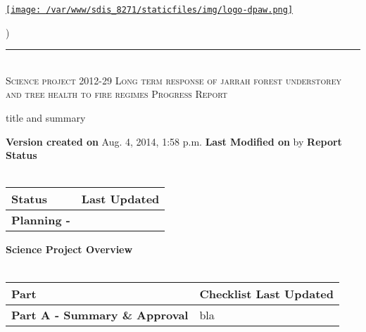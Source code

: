 \documentclass[version=last, paper=a4, DIV=18, usenames, dvipsnames]{scrartcl}
\newcommand{\HRule}{\rule{\linewidth}{0.1pt}}
\begin{document}
\setcounter{secnumdepth}{-1}


\begin{titlepage}
\begin{center}
\begin{minipage}[t]{0.28\textwidth}
\begin{flushleft}
\href{http://www.dpaw.wa.gov.au}{\texttt{[image: /var/www/sdis\_8271/staticfiles/img/logo-dpaw.png]}}
\end{flushleft}
\end{minipage}
\begin{minipage}[b]{0.7\textwidth}
\begin{flushright}
    \href{http://sdis.dpaw.wa.gov.au/documents/progressreport/1021/download/tex/}{}) \\
\end{flushright}
\end{minipage}
\HRule \\[0.4cm]
\vfill
\textsc{\Huge Science project 2012-29 Long term response of jarrah forest understorey and tree health to fire regimes \newline }
\vfill
\textsc{\Huge Progress Report}

\vfill\vfill\vfill\vfill
title and summary

\vfill\vfill\vfill\vfill\vfill\vfill\vfill\vfill

\textbf{Version created on} Aug. 4, 2014, 1:58 p.m.
\vfill
\textbf{Last Modified on}  by 
\vfill\vfill
\textbf{Report Status}\\\,
\begin{tabu} to \linewidth { | X[l] | X | }
\hline
{}
Status & Last Updated \\
\hline
\textbf{Planning - } \\
\hline
\end{tabu}
\vfill
\textbf{Science Project Overview}\\\,
\begin{tabu} to \linewidth { | X[l] | X | }
\hline
{}
Part & Checklist Last Updated \\
\hline
\textbf{Part A - Summary \& Approval} & bla \\
\hline
\end{tabu}

\end{center}
\end{titlepage}

\setcounter{tocdepth}{2}
\tableofcontents
\clearpage
\end{document}
